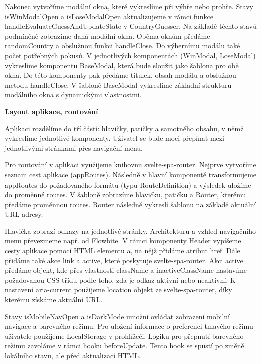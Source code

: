 Nakonec vytvoříme modální okna, které vykreslíme při výhře nebo prohře. Stavy isWinModalOpen a isLoseModalOpen aktualizujeme v rámci funkce handleEvaluateGuessAndUpdateState v CountryGuesser. 
Na základě těchto stavů podmíněně zobrazíme daná modální okna. Oběma oknům předáme randomCountry a obslužnou funkci handleClose. Do výhernímu modálu také počet potřebných pokusů. 
V jednotlivých komponentách (WinModal, LoseModal) vykreslíme komponentu BaseModal, která bude sloužit jako šablona pro obě okna. Do této komponenty pak předáme titulek, obsah modálu a obslužnou metodu handleClose. 
V šabloně BaseModal vykreslíme základní strukturu modálního okna s dynamickými vlastnostmi.

\begin{flushleft}
  \textbf{Layout aplikace, routování}
\end{flushleft}

Aplikaci rozdělíme do tří částí: hlavičky, patičky a samotného obsahu, v němž vykreslíme jednotlivé komponenty. Uživatel se bude moci přepínat mezi jednotlivými stránkami přes navigační menu. 

Pro routování v aplikaci využijeme knihovnu svelte-spa-router. Nejprve vytvoříme seznam cest aplikace (appRoutes). 
Následně v hlavní komponentě transformujeme appRoutes do požadovaného formátu (typu RouteDefinition) a výsledek uložíme do proměnné routes. 
V šabloně zobrazíme hlavičku, patičku a Router, kterému předáme proměnnou routes. Router následně vykreslí šablonu na základě aktuální URL adresy.

Hlavička zobrazí odkazy na jednotlivé stránky. Architekturu a vzhled navigačního menu převezmeme např. od Flowbite. 
V rámci komponenty Header vypíšeme cesty aplikace pomocí HTML elementu a, na nějž přidáme atribut href. Dále přidáme také akce link a active, které poskytuje svelte-spa-router. 
Akci active předáme objekt, kde přes vlastnosti className a inactiveClassName nastavíme požadovanou CSS třídu podle toho, zda je odkaz aktivní nebo neaktivní. 
K nastavení aria-current použijeme location objekt ze svelte-spa-router, díky kterému získáme aktuální URL.

Stavy isMobileNavOpen a isDarkMode umožní ovládat zobrazení mobilní navigace a barevného režimu. 
Pro uložení informace o preferenci tmavého režimu uživatele použijeme LocalStorage v prohlížeči. Logiku pro přepnutí barevného režimu zavoláme v rámci hooku beforeUpdate. 
Tento hook se spustí po změně lokálního stavu, ale před aktualizací HTML.